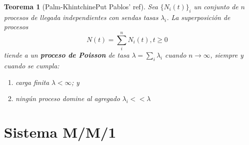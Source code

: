 \documentclass[xcolor={x11names}]{beamer}
\newtheorem{thm}{Teorema}[section] %
\begin{document}
\begin{frame}{\secname}
    \begin{thm}[Palm-Khintchine{\color{red}Put Pablos' ref}]
        Sea $\{N_i(t)\}_i$ un conjunto de $n$
        procesos de llegada independientes
        con sendas tasas
        $\lambda_i$.
        La superposición de procesos
        \begin{equation}
            N(t)=\sum_i^n N_i(t), t\geq0
        \end{equation}
        tiende a un \textbf{proceso de Poisson}
        de tasa $\lambda=\sum_i \lambda_i$
        cuando $n\to\infty$, siempre y cuando
        se cumpla:
        \begin{enumerate}
            \item carga finita $\lambda<\infty$; y
            \item ningún proceso domine al
                agregado $\lambda_i<<\lambda$
        \end{enumerate}
    \end{thm}
    
\end{frame}



\section{Sistema M/M/1}
\end{document}
